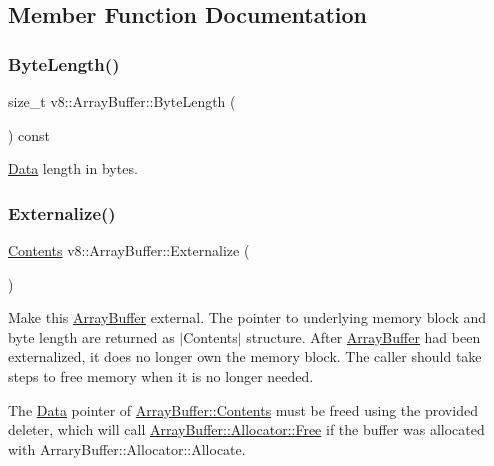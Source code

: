 \subsection{Member Function Documentation}
\mbox{\label{classv8_1_1ArrayBuffer_af4c4ad8075f74892ed3fa217219a2626}} 
\subsubsection{\texorpdfstring{Byte\+Length()}{ByteLength()}}
{\footnotesize\ttfamily size\+\_\+t v8\+::\+Array\+Buffer\+::\+Byte\+Length (\begin{DoxyParamCaption}{ }\end{DoxyParamCaption}) const}

\mbox{\hyperlink{classv8_1_1Data}{Data}} length in bytes. \mbox{\label{classv8_1_1ArrayBuffer_a8b90b72486cfacb4fbec157f4803f889}} 
\subsubsection{\texorpdfstring{Externalize()}{Externalize()}}
{\footnotesize\ttfamily \mbox{\hyperlink{classv8_1_1ArrayBuffer_1_1Contents}{Contents}} v8\+::\+Array\+Buffer\+::\+Externalize (\begin{DoxyParamCaption}{ }\end{DoxyParamCaption})}

Make this \mbox{\hyperlink{classv8_1_1ArrayBuffer}{Array\+Buffer}} external. The pointer to underlying memory block and byte length are returned as $\vert$\+Contents$\vert$ structure. After \mbox{\hyperlink{classv8_1_1ArrayBuffer}{Array\+Buffer}} had been externalized, it does no longer own the memory block. The caller should take steps to free memory when it is no longer needed.

The \mbox{\hyperlink{classv8_1_1Data}{Data}} pointer of \mbox{\hyperlink{classv8_1_1ArrayBuffer_1_1Contents}{Array\+Buffer\+::\+Contents}} must be freed using the provided deleter, which will call \mbox{\hyperlink{classv8_1_1ArrayBuffer_1_1Allocator_a419f59d2a103a5a8863809d7977c9cd8}{Array\+Buffer\+::\+Allocator\+::\+Free}} if the buffer was allocated with Arrary\+Buffer\+::\+Allocator\+::\+Allocate. \mbox{\label{classv8_1_1ArrayBuffer_ae44291df12ca35de9b519e7372aa640a}} 
